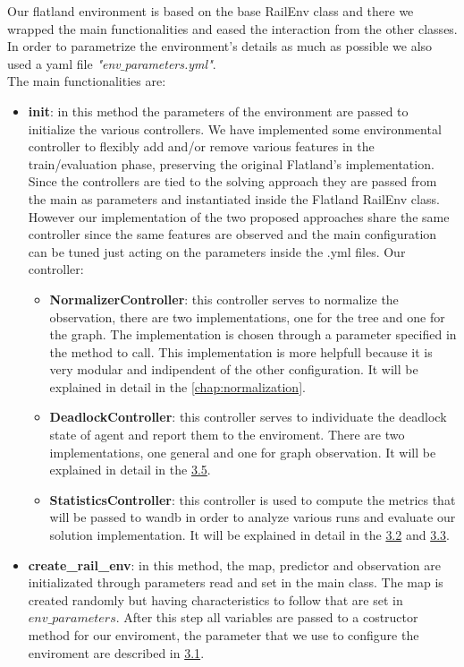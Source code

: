 Our flatland environment is based on the base RailEnv class and there we wrapped the main functionalities and eased the interaction from the other classes. In order to parametrize the environment's details as much as possible we also used a yaml file \textit{"env$\_$parameters.yml"}.\\
The main functionalities are:
\begin{itemize}
\item \textbf{init}: in this method the parameters of the environment are passed to initialize the various controllers. We have implemented some environmental controller to flexibly add and/or remove various features in the train/evaluation phase, preserving the original Flatland’s implementation. Since the controllers are tied to the solving approach they are passed from the main as parameters and instantiated inside the Flatland RailEnv class. However our implementation of the two proposed approaches share the same controller since the same features are observed and the main configuration can be tuned just acting on the parameters inside the .yml files.
Our controller:
\begin{itemize}
	\item \textbf{NormalizerController}: this controller serves to normalize the observation, there are two implementations, one for the tree and one for the graph. The implementation is chosen through a parameter specified in the method to call. This implementation is more helpfull because it is very modular and indipendent of the other configuration. It will be explained in detail in the \autoref{chap:normalization}.
	\item \textbf{DeadlockController}: this controller serves to individuate the deadlock state of agent and report them to the enviroment. There are two implementations, one general and one for graph observation. It will be explained in detail in the \hyperref[sec:deadlockController]{3.5}.
	\item \textbf{StatisticsController}: this controller is used to compute the metrics that will be passed to wandb in order to analyze various runs and evaluate our solution implementation. It will be explained in detail in the \hyperref[sec:metrics]{3.2} and \hyperref[sec:evaluation]{3.3}.
\end{itemize}
\item \textbf{create\_rail\_env}: in this method, the map, predictor and observation are initializated through parameters read and set in the main class. The map is created randomly but having characteristics to follow that are set in $env\_parameters$. After this step all variables are passed to a costructor method for our enviroment, the parameter that we use to configure the enviroment are described in \hyperref[sec:ourParameters]{3.1}.

\end{itemize}

